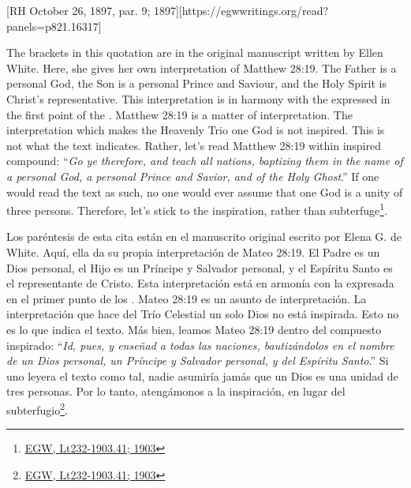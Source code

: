 [RH October 26, 1897, par. 9; 1897][https://egwwritings.org/read?panels=p821.16317]


The brackets in this quotation are in the original manuscript written by Ellen White. Here, she gives her own interpretation of Matthew 28:19. The Father is a personal God, the Son is a personal Prince and Saviour, and the Holy Spirit is Christ’s representative. This interpretation is in harmony with the  expressed in the first point of the . Matthew 28:19 is a matter of interpretation. The interpretation which makes the Heavenly Trio one God is not inspired. This is not what the text indicates. Rather, let's read Matthew 28:19 within inspired compound: “\textit{Go ye therefore, and teach all nations, baptizing them in the name of a personal God, a personal Prince and Savior, and of the Holy Ghost}.” If one would read the text as such, no one would ever assume that one God is a unity of three persons. Therefore, let's stick to the inspiration, rather than subterfuge\footnote{\href{https://egwwritings.org/?ref=en\_Lt232-1903.41&para=10197.50}{{EGW, Lt232-1903.41; 1903}}}.


Los paréntesis de esta cita están en el manuscrito original escrito por Elena G. de White. Aquí, ella da su propia interpretación de Mateo 28:19. El Padre es un Dios personal, el Hijo es un Príncipe y Salvador personal, y el Espíritu Santo es el representante de Cristo. Esta interpretación está en armonía con la  expresada en el primer punto de los . Mateo 28:19 es un asunto de interpretación. La interpretación que hace del Trío Celestial un solo Dios no está inspirada. Esto no es lo que indica el texto. Más bien, leamos Mateo 28:19 dentro del compuesto inspirado: “\textit{Id, pues, y enseñad a todas las naciones, bautizándolos en el nombre de un Dios personal, un Príncipe y Salvador personal, y del Espíritu Santo}.” Si uno leyera el texto como tal, nadie asumiría jamás que un Dios es una unidad de tres personas. Por lo tanto, atengámonos a la inspiración, en lugar del subterfugio\footnote{\href{https://egwwritings.org/?ref=en\_Lt232-1903.41&para=10197.50}{{EGW, Lt232-1903.41; 1903}}}.


